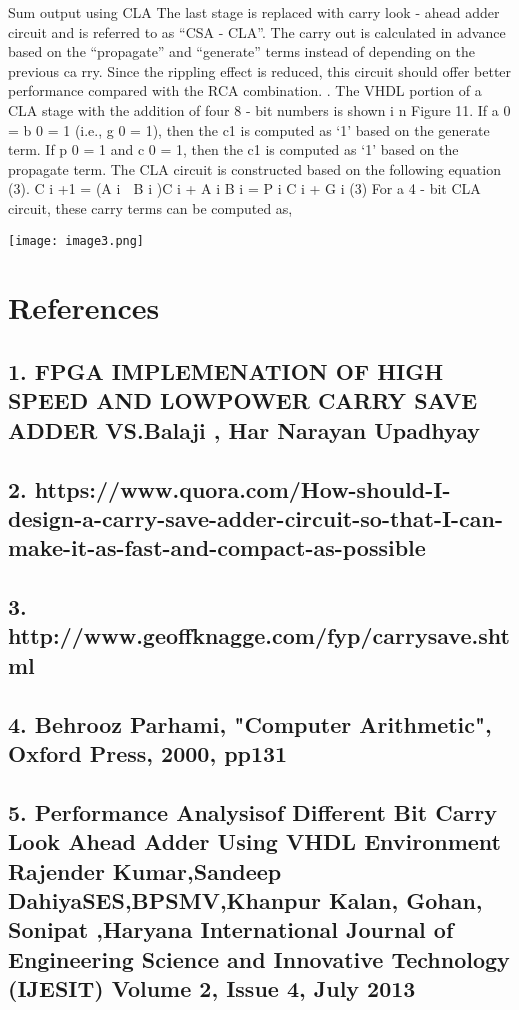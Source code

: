 \documentclass[11pt, twoside]{article}
\begin{document}
Sum output using CLA
The last stage is replaced with carry look
-
ahead adder circuit and is referred to as “CSA
-
CLA”. The carry out 
is calculated in advance based on the “propagate” and “generate” terms instead of depending on the 
previous ca
rry. Since the rippling effect is reduced, this circuit should offer better performance compared 
with  the  RCA  combination.
.  The  VHDL  portion  of    a  CLA 
stage with the addition of four 8
-
bit numbers is shown i
n Figure 11. If a
0
= b
0
= 1 (i.e., g
0
= 1), then the c1 
is computed as ‘1’ based on the 
generate
term. If p
0
= 1 and c
0
= 1, then the c1 is computed as ‘1’ based 
on the 
propagate
term. The CLA circuit is constructed based on the following equation (3). 
C
i
+1
= (A
i

B
i
)C
i
+ A
i
B
i
= P
i
C
i
+ G
i
(3)
For a 4
-
bit CLA circuit, these carry terms can be computed as,

\texttt{[image: image3.png]}
\section{References}
 \subsection{ 1. FPGA IMPLEMENATION OF HIGH SPEED AND LOWPOWER CARRY SAVE ADDER 
VS.Balaji , Har Narayan Upadhyay}

 \subsection{ 2. https://www.quora.com/How-should-I-design-a-carry-save-adder-circuit-so-that-I-can-make-it-as-fast-and-compact-as-possible}
  \subsection{3. http://www.geoffknagge.com/fyp/carrysave.shtml}
 \subsection{4. Behrooz Parhami, "Computer Arithmetic", Oxford Press, 2000, pp131}
 \subsection{5. Performance Analysisof Different Bit  Carry Look Ahead Adder Using VHDL  Environment
Rajender Kumar,Sandeep DahiyaSES,BPSMV,Khanpur Kalan, Gohan, Sonipat ,Haryana
 International Journal of Engineering Science and Innovative Technology (IJESIT)
Volume 2, Issue 
4, July 2013}
\end{document}
